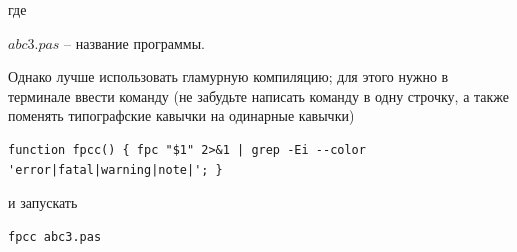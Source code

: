 \documentclass[unicode, 12pt, a4paper,oneside,fleqn]{article}
\begin{document}
\begin{enumerate}
  где \begin{description}
  \item $ abc3.pas $ -- название программы.
  \end{description}


  Однако лучше использовать гламурную компиляцию; для этого нужно в
  терминале ввести команду (не забудьте написать команду в одну
  строчку, а также поменять типографские кавычки на одинарные кавычки)


  

\begin{Verbatim}[fontsize=\tiny,frame=single]
function fpcc() { fpc "$1" 2>&1 | grep -Ei --color 'error|fatal|warning|note|'; }
\end{Verbatim}



 
и запускать
\begin{lstlisting}[language=bash]
fpcc abc3.pas
\end{lstlisting}


\end{enumerate}
\end{document}

